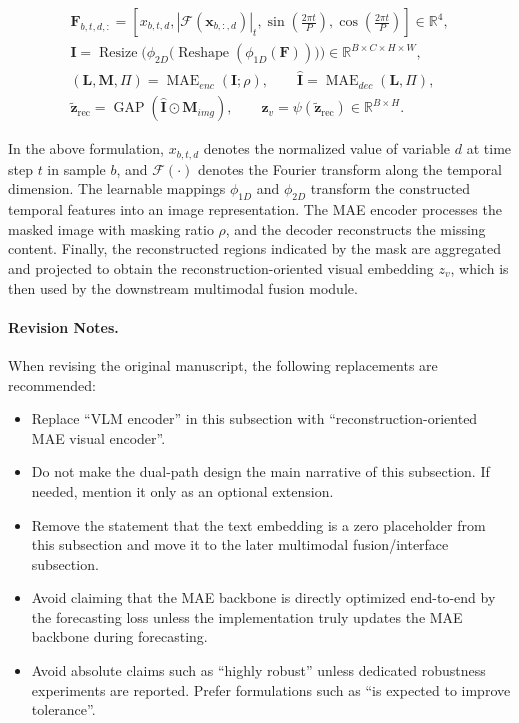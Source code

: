 \begin{gather}
\mathbf{F}_{b,t,d,:}=
\left[
x_{b,t,d},
\left|\mathcal{F}(\mathbf{x}_{b,:,d})\right|_{t},
\sin\!\left(\frac{2\pi t}{P}\right),
\cos\!\left(\frac{2\pi t}{P}\right)
\right] \in \mathbb{R}^{4}, \\
\mathbf{I}=
\operatorname{Resize}\!\Big(
\phi_{2D}\big(
\operatorname{Reshape}(\phi_{1D}(\mathbf{F}))
\big)
\Big)
\in \mathbb{R}^{B \times C \times H \times W}, \\
(\mathbf{L},\mathbf{M},\Pi)=\operatorname{MAE}_{enc}(\mathbf{I};\rho),
\qquad
\hat{\mathbf{I}}=\operatorname{MAE}_{dec}(\mathbf{L},\Pi), \\
\tilde{\mathbf{z}}_{\mathrm{rec}}
=
\operatorname{GAP}\!\left(\hat{\mathbf{I}} \odot \mathbf{M}_{img}\right),
\qquad
\mathbf{z}_v=\psi\!\left(\tilde{\mathbf{z}}_{\mathrm{rec}}\right)\in\mathbb{R}^{B \times H}.
\end{gather}

In the above formulation, $x_{b,t,d}$ denotes the normalized value of variable $d$ at time step $t$ in sample $b$, and $\mathcal{F}(\cdot)$ denotes the Fourier transform along the temporal dimension. The learnable mappings $\phi_{1D}$ and $\phi_{2D}$ transform the constructed temporal features into an image representation. The MAE encoder processes the masked image with masking ratio $\rho$, and the decoder reconstructs the missing content. Finally, the reconstructed regions indicated by the mask are aggregated and projected to obtain the reconstruction-oriented visual embedding $z_v$, which is then used by the downstream multimodal fusion module.

\paragraph{Revision Notes.}
When revising the original manuscript, the following replacements are recommended:
\begin{itemize}
    \item Replace ``VLM encoder'' in this subsection with ``reconstruction-oriented MAE visual encoder''.
    \item Do not make the dual-path design the main narrative of this subsection. If needed, mention it only as an optional extension.
    \item Remove the statement that the text embedding is a zero placeholder from this subsection and move it to the later multimodal fusion/interface subsection.
    \item Avoid claiming that the MAE backbone is directly optimized end-to-end by the forecasting loss unless the implementation truly updates the MAE backbone during forecasting.
    \item Avoid absolute claims such as ``highly robust'' unless dedicated robustness experiments are reported. Prefer formulations such as ``is expected to improve tolerance''.
\end{itemize}

